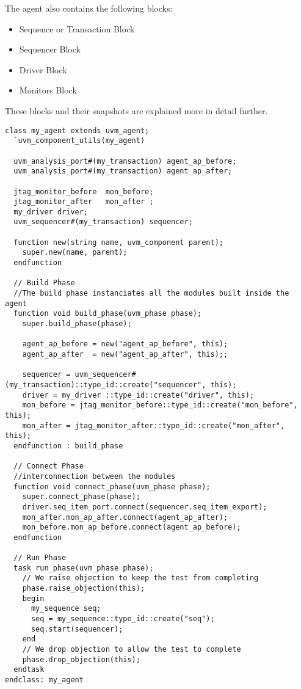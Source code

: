 \documentclass[a4paper,11pt]{article}
\begin{document}
The agent also contains the following blocks:
\begin{itemize}[noitemsep]
\item Sequence or Transaction Block
\item Sequencer Block
\item Driver Block
\item Monitors Block
\end{itemize}
These blocks and their snapshots are explained more in detail further.

\begin{lstlisting}[style={verilog-style}, backgroundcolor=\color{lightgray}]
class my_agent extends uvm_agent;
  `uvm_component_utils(my_agent)

  uvm_analysis_port#(my_transaction) agent_ap_before;
  uvm_analysis_port#(my_transaction) agent_ap_after;
	
  jtag_monitor_before  mon_before;
  jtag_monitor_after   mon_after ;
  my_driver driver;
  uvm_sequencer#(my_transaction) sequencer;

  function new(string name, uvm_component parent);
    super.new(name, parent);
  endfunction

  // Build Phase
  //The build phase instanciates all the modules built inside the agent
  function void build_phase(uvm_phase phase);
    super.build_phase(phase);
		
    agent_ap_before = new("agent_ap_before", this);
    agent_ap_after  = new("agent_ap_after", this);;
		
    sequencer = uvm_sequencer#(my_transaction)::type_id::create("sequencer", this);
    driver = my_driver ::type_id::create("driver", this);
    mon_before = jtag_monitor_before::type_id::create("mon_before", this);
    mon_after = jtag_monitor_after::type_id::create("mon_after", this);		
  endfunction : build_phase

  // Connect Phase
  //interconnection between the modules
  function void connect_phase(uvm_phase phase);
    super.connect_phase(phase);		
    driver.seq_item_port.connect(sequencer.seq_item_export);		
    mon_after.mon_ap_after.connect(agent_ap_after);
    mon_before.mon_ap_before.connect(agent_ap_before);		
  endfunction

  // Run Phase
  task run_phase(uvm_phase phase);	
    // We raise objection to keep the test from completing
    phase.raise_objection(this);  
    begin
      my_sequence seq;
      seq = my_sequence::type_id::create("seq");
      seq.start(sequencer);
    end	
    // We drop objection to allow the test to complete
    phase.drop_objection(this);  
  endtask
endclass: my_agent
\end{lstlisting}
\end{document}
